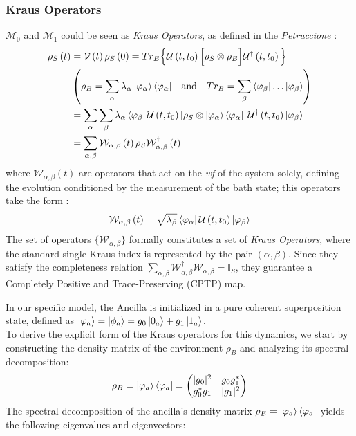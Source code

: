 \documentclass[a4paper,12pt]{article}
\begin{document}
\subsubsection{Kraus Operators}
\label{subsub:Kraus_Operators}
$ \mathcal{M}_0 $ and $ \mathcal{M}_1 $ could be seen as \textit{Kraus Operators}, as defined in the \textit{Petruccione} :
\begin{align}
	\rho_{S} \left(t\right) &= \mathcal{V}\left(t\right) \rho_{S} \left(0\right) = Tr_{B} \Big\{ \mathcal{U}\left(t, t_0\right) \Big[ \rho_{S} \otimes \rho_{B} \Big] \mathcal{U}^{\dagger}\left(t, t_0\right) \Big\} \\
	&\left( \rho_{B} = \sum_{\alpha}{\lambda_{\alpha} \ket{\varphi_{\alpha}} \bra{\varphi_{\alpha}}} \quad \text{and} \quad Tr_{B} = \sum_{\beta}{\bra{\varphi_{\beta}} \dots \ket{\varphi_{\beta}}} \right) \notag \\
	&= \sum_{\alpha}{\sum_{\beta}{\lambda_{\alpha}\bra{\varphi_{\beta}} \mathcal{U}\left(t, t_0\right) \left[ \rho_{S} \otimes \ket{\varphi_{\alpha}} \bra{\varphi_{\alpha}} \right]  \mathcal{U}^{\dagger}\left(t, t_0\right) \ket{\varphi_{\beta}} }} \notag \\
	&= \sum_{\alpha, \beta}{ \mathcal{W}_{\alpha, \beta} \left(t\right) \rho_{S} \mathcal{W}^{\dagger}_{\alpha, \beta} \left(t\right) }
	\label{eq:dynamical_map_kraus_operators}
\end{align}
where $ \mathcal{W}_{\alpha, \beta} \left(t\right) $ are operators that act on the \textit{wf} of the system solely, defining the evolution conditioned by the measurement of the bath state; this operators take the form :
\begin{equation}
	\mathcal{W}_{\alpha, \beta} \left(t\right) = \sqrt{\lambda_{\beta}} \bra{\varphi_{\alpha}}  \mathcal{U}\left(t, t_0\right) \ket{\varphi_{\beta}}
	\label{eq:general_kraus_operators}
\end{equation}
The set of operators $\{ \mathcal{W}_{\alpha, \beta} \}$ formally constitutes a set of \textit{Kraus Operators}, where the standard single Kraus index is represented by the pair $(\alpha, \beta)$. Since they satisfy the completeness relation $\sum_{\alpha, \beta} \mathcal{W}_{\alpha, \beta}^\dagger \mathcal{W}_{\alpha, \beta} = \mathbb{I}_S$, they guarantee a Completely Positive and Trace-Preserving (CPTP) map.

\newpage

In our specific model, the Ancilla is initialized in a pure coherent superposition state, defined as $\ket{\varphi_{a}} =  \ket{\phi_a} = g_0 \ket{0_a} + g_1 \ket{1_a}$. \\
To derive the explicit form of the Kraus operators for this dynamics, we start by constructing the density matrix of the environment $\rho_B$ and analyzing its spectral decomposition:
\begin{equation}
	\rho_B = \ket{\varphi_a}\bra{\varphi_a} =
	\begin{pmatrix}
	|g_0|^2 & g_0 g_1^* \\
	g_0^* g_1 & |g_1|^2
	\end{pmatrix}
\end{equation}
The spectral decomposition of the ancilla's density matrix $\rho_B = \ket{\varphi_{a}}\bra{\varphi_{a}}$ yields the following eigenvalues and eigenvectors:
\end{document}
